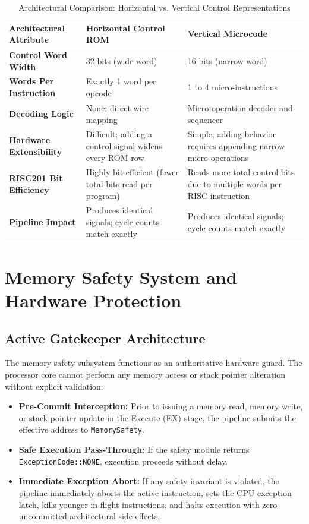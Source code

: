 \documentclass[11pt,a4paper]{article}
\begin{document}
\begin{table}[h]
\centering
\small
\caption{Architectural Comparison: Horizontal vs. Vertical Control Representations}
\vspace{0.4em}
\begin{tabularx}{\textwidth}{l Y Y}
\toprule
\textbf{Architectural Attribute} & \textbf{Horizontal Control ROM} & \textbf{Vertical Microcode} \\
\midrule
\textbf{Control Word Width} & 32 bits (wide word) & 16 bits (narrow word) \\
\textbf{Words Per Instruction} & Exactly 1 word per opcode & 1 to 4 micro-instructions \\
\textbf{Decoding Logic} & None; direct wire mapping & Micro-operation decoder and sequencer \\
\textbf{Hardware Extensibility} & Difficult; adding a control signal widens every ROM row & Simple; adding behavior requires appending narrow micro-operations \\
\textbf{RISC201 Bit Efficiency} & Highly bit-efficient (fewer total bits read per program) & Reads more total control bits due to multiple words per RISC instruction \\
\textbf{Pipeline Impact} & Produces identical signals; cycle counts match exactly & Produces identical signals; cycle counts match exactly \\
\bottomrule
\end{tabularx}
\end{table}

\section{Memory Safety System and Hardware Protection}

\subsection{Active Gatekeeper Architecture}
The memory safety subsystem functions as an authoritative hardware guard. The processor core cannot perform any memory access or stack pointer alteration without explicit validation:
\begin{itemize}
    \item \textbf{Pre-Commit Interception:} Prior to issuing a memory read, memory write, or stack pointer update in the Execute (EX) stage, the pipeline submits the effective address to \texttt{MemorySafety}.
    \item \textbf{Safe Execution Pass-Through:} If the safety module returns \texttt{ExceptionCode::NONE}, execution proceeds without delay.
    \item \textbf{Immediate Exception Abort:} If any safety invariant is violated, the pipeline immediately aborts the active instruction, sets the CPU exception latch, kills younger in-flight instructions, and halts execution with zero uncommitted architectural side effects.
\end{itemize}
\end{document}
